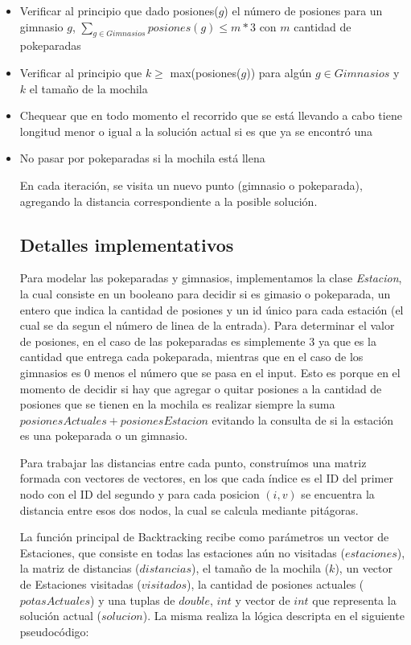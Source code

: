             \begin{itemize}
                \item{Verificar al principio que dado posiones($g$) el número de posiones para un gimnasio $g$, \newline $\sum_{g \in Gimnasios} posiones(g) \leq m*3$ con $m$ cantidad de pokeparadas}
                \item{Verificar al principio que $k \geq$ max(posiones($g$)) para algún $g \in Gimnasios$ y $k$ el tamaño de la mochila}
                \item{Chequear que en todo momento el recorrido que se está llevando a cabo tiene longitud menor o igual a la solución actual si es que ya se encontró una}
                \item{No pasar por pokeparadas si la mochila está llena}

        En cada iteración, se visita un nuevo punto (gimnasio o pokeparada), agregando la distancia correspondiente a la posible solución.


        \subsection{Detalles implementativos}
            Para modelar las pokeparadas y gimnasios, implementamos la clase \textit{Estacion}, la cual consiste en un booleano para decidir si es gimasio o pokeparada, un entero que indica la cantidad de posiones y un id único para cada estación (el cual se da segun el número de linea de la entrada). Para determinar el valor de posiones, en el caso de las pokeparadas es simplemente 3 ya que es la cantidad que entrega cada pokeparada, mientras que en el caso de los gimnasios es 0 menos el número que se pasa en el input. Esto es porque en el momento de decidir si hay que agregar o quitar posiones a la cantidad de posiones que se tienen en la mochila es realizar siempre la suma $posionesActuales + posionesEstacion$ evitando la consulta de si la estación es una pokeparada o un gimnasio.

            Para trabajar las distancias entre cada punto, construímos una matriz formada con vectores de vectores, en los que cada índice es el ID del primer nodo con el ID del segundo y para cada posicion $(i,v)$ se encuentra la distancia entre esos dos nodos, la cual se calcula mediante pitágoras.

            La función principal de Backtracking recibe como parámetros un vector de Estaciones, que consiste en todas las estaciones aún no visitadas ($estaciones$), la matriz de distancias ($distancias$), el tamaño de la mochila ($k$), un vector de Estaciones visitadas ($visitados$), la cantidad de posiones actuales ($potasActuales$) y una tuplas de $double$, $int$ y vector de $int$ que representa la solución actual ($solucion$). La misma realiza la lógica descripta en el siguiente pseudocódigo:


\end{itemize}
